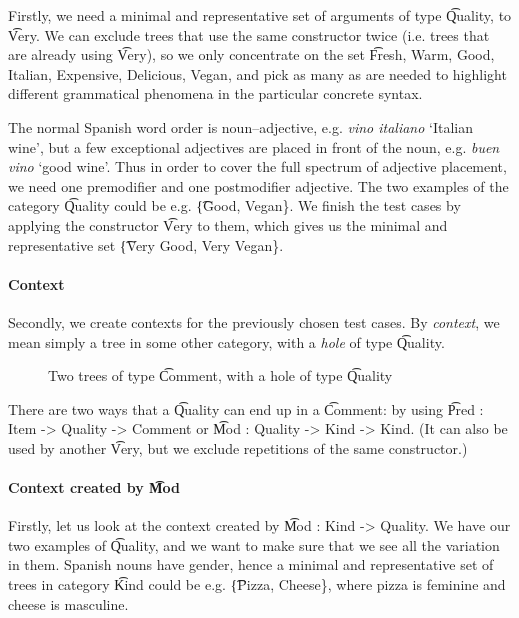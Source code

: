 Firstly, we need a minimal and representative set of arguments of type \t{Quality}, to \t{Very}. We can exclude trees that use the same constructor twice (i.e. trees that are already using \t{Very}), so we only concentrate on the set \t{Fresh, Warm, Good, Italian, Expensive, Delicious, Vegan}, and pick as many as are needed to highlight different grammatical phenomena in the particular concrete syntax.

The normal Spanish word order is noun--adjective, e.g. \emph{vino italiano} `Italian wine', but a few exceptional adjectives are placed in front of the noun, e.g. \emph{buen vino} `good wine'. Thus in order to cover the full spectrum of adjective placement, we need one premodifier and one postmodifier adjective. The two examples of the category \t{Quality} could be e.g. \t{\{Good, Vegan\}}. We finish the test cases by applying the constructor \t{Very} to them, which gives us the minimal and representative set \t{\{Very Good, Very Vegan\}}.


\paragraph{Context} 

Secondly, we create contexts for the previously chosen test cases. By \emph{context}, we mean simply a tree in some other category, with a \emph{hole} of type \t{Quality}.


\begin{figure}[h]

  \centering
 \caption{Two trees of type \t{Comment}, with a hole of type \t{Quality}}
\end{figure}

There are two ways that a \t{Quality} can end up in a \t{Comment}: by using \t{Pred : Item -> Quality -> Comment} or \t{Mod : Quality -> Kind -> Kind}. (It can also be used by another \t{Very}, but we exclude repetitions of the same constructor.) 

\paragraph{Context created by \t{Mod}} Firstly, let us look at the context created by \t{Mod : Kind -> Quality}.
We have our two examples of \t{Quality}, and we want to make sure that we see all the variation in them.
Spanish nouns have gender, hence a minimal and representative set of trees in category \t{Kind} could be e.g. \t{\{Pizza, Cheese\}}, where pizza is feminine and cheese is masculine. 

